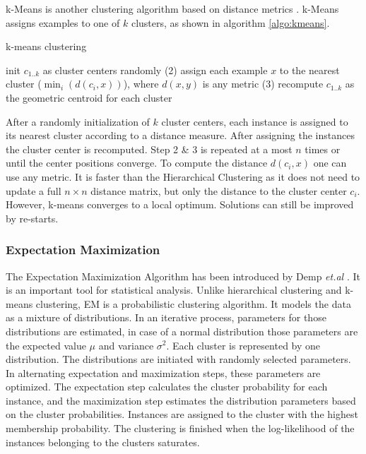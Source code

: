 						k-Means is another clustering algorithm based on distance metrics \cite{MacQueen67}. k-Means assigns examples to one of $ k $ clusters, as shown in algorithm \ref{algo:kmeans}.

						\begin{algorithm}
							\caption{k-means clustering}
							\label{algo:kmeans}
							\begin{algorithmic}
								\STATE init $c_{1..k}$ as cluster centers randomly
									\STATE (2) assign each example $ x $ to the nearest cluster ($ \min_{i} (d(c_i,x))$), where $d(x,y)$ is any metric
									\STATE (3) recompute $c_{1..k}$ as the geometric centroid for each cluster
								\ENDWHILE
							\end{algorithmic}
						\end{algorithm}

						After a randomly initialization of $k$ cluster centers, each instance is  assigned to its nearest cluster according to a distance measure. After assigning the instances the cluster center is recomputed. Step 2 \& 3 is repeated at a most $ n $ times or until the center positions converge. To compute the distance $ d(c_i,x) $ one can use any metric. It is faster than the Hierarchical Clustering as it does not need to update a full $n\times n$ distance matrix, but only the distance to the cluster center $ c_i $. However, k-means converges to a local optimum. Solutions can still be improved by re-starts.

					\subsubsection{Expectation Maximization}
					\label{subsubsec:em}

						The Expectation Maximization Algorithm has been introduced by Demp \textit{et.al} \cite{Demp77}. It is an important tool for statistical analysis. Unlike hierarchical clustering and k-means clustering, EM is a probabilistic clustering algorithm. It models the data as a mixture of distributions. In an iterative process, parameters for those distributions are estimated, in case of a normal distribution those parameters are the expected value $\mu$ and variance $\sigma^2$. Each cluster is represented by one distribution.  The distributions are initiated with randomly selected parameters. In alternating expectation and maximization steps, these parameters are optimized. The expectation step calculates the cluster probability for each instance, and the maximization step estimates the distribution parameters based on the cluster probabilities. Instances are assigned to the cluster with the highest membership probability. The clustering is finished when the log-likelihood of the instances belonging to the clusters saturates.

